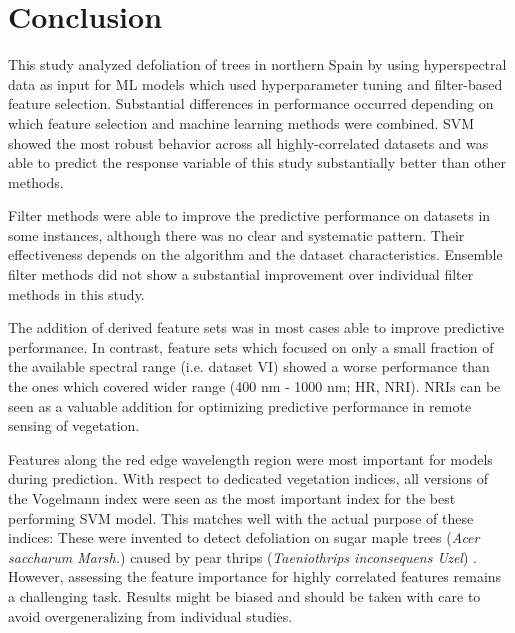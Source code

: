 \documentclass[final]{IEEEtran}
\begin{document}
\section{Conclusion}

This study analyzed defoliation of trees in northern Spain by using hyperspectral data as input for ML models which used hyperparameter tuning and filter-based feature selection.
Substantial differences in performance occurred depending on which feature selection and machine learning methods were combined.
SVM showed the most robust behavior across all highly-correlated datasets and was able to predict the response variable of this study substantially better than other methods.

Filter methods were able to improve the predictive performance on datasets in some instances, although there was no clear and systematic pattern.
Their effectiveness depends on the algorithm and the dataset characteristics.
Ensemble filter methods did not show a substantial improvement over individual filter methods in this study.

The addition of derived feature sets was in most cases able to improve predictive performance.
In contrast, feature sets which focused on only a small fraction of the available spectral range (i.e. dataset VI) showed a worse performance than the ones which covered wider range (400 nm - 1000 nm; HR, NRI).
NRIs can be seen as a valuable addition for optimizing predictive performance in remote sensing of vegetation.

Features along the red edge wavelength region were most important for models during prediction.
With respect to dedicated vegetation indices, all versions of the Vogelmann index were seen as the most important index for the best performing SVM model.
This matches well with the actual purpose of these indices:
These were invented to detect defoliation on sugar maple trees (\textit{Acer saccharum Marsh.}) caused by pear thrips (\textit{Taeniothrips inconsequens Uzel}) \cite{vogelmann1993}.
However, assessing the feature importance for highly correlated features remains a challenging task.
Results might be biased and should be taken with care to avoid overgeneralizing from individual studies.
\end{document}

